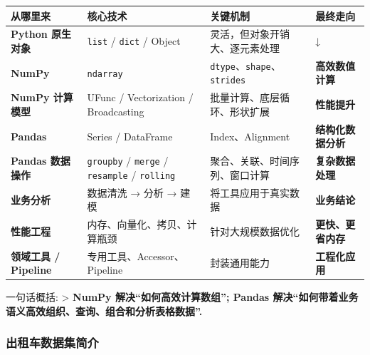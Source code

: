 \documentclass[11pt]{article}
\begin{document}
{\def\LTcaptype{none} %
\begin{longtable}[]{@{}
  >{\centering\arraybackslash}p{}
  >{\centering\arraybackslash}p{}
  >{\centering\arraybackslash}p{}
  >{\centering\arraybackslash}p{}@{}}
\toprule\noalign{}
\begin{minipage}[b]{\linewidth}\centering
从哪里来
\end{minipage} & \begin{minipage}[b]{\linewidth}\centering
核心技术
\end{minipage} & \begin{minipage}[b]{\linewidth}\centering
关键机制
\end{minipage} & \begin{minipage}[b]{\linewidth}\centering
最终走向
\end{minipage} \\
\midrule\noalign{}
\endhead
\bottomrule\noalign{}
\endlastfoot
\textbf{Python 原生对象} & \texttt{list} / \texttt{dict} / Object &
灵活，但对象开销大、逐元素处理 & ↓ \\
\textbf{NumPy} & \texttt{ndarray} &
\texttt{dtype}、\texttt{shape}、\texttt{strides} &
\textbf{高效数值计算} \\
\textbf{NumPy 计算模型} & UFunc / Vectorization / Broadcasting &
批量计算、底层循环、形状扩展 & \textbf{性能提升} \\
\textbf{Pandas} & Series / DataFrame & Index、Alignment &
\textbf{结构化数据分析} \\
\textbf{Pandas 数据操作} & \texttt{groupby} / \texttt{merge} /
\texttt{resample} / \texttt{rolling} & 聚合、关联、时间序列、窗口计算 &
\textbf{复杂数据处理} \\
\textbf{业务分析} & 数据清洗 → 分析 → 建模 & 将工具应用于真实数据 &
\textbf{业务结论} \\
\textbf{性能工程} & 内存、向量化、拷贝、计算瓶颈 & 针对大规模数据优化 &
\textbf{更快、更省内存} \\
\textbf{领域工具 / Pipeline} & 专用工具、Accessor、Pipeline &
封装通用能力 & \textbf{工程化应用} \\
\end{longtable}
}

一句话概括: \textgreater{} \textbf{NumPy 解决``如何高效计算数组'';
Pandas 解决``如何带着业务语义高效组织、查询、组合和分析表格数据''.}

    \subsubsection{出租车数据集简介}\label{ux51faux79dfux8f66ux6570ux636eux96c6ux7b80ux4ecb}
\end{document}
